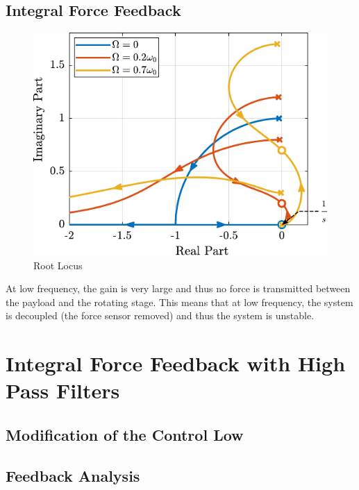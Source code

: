 \documentclass{ISMA_USD2020}
\begin{document}
\subsection{Integral Force Feedback}
\label{sec:orga5d8887}

\begin{figure}[htbp]
\centering
\includegraphics[scale=1]{figs/root_locus_pure_iff.pdf}
\caption{\label{fig:root_locus_pure_iff}Root Locus}
\end{figure}

At low frequency, the gain is very large and thus no force is transmitted between the payload and the rotating stage.
This means that at low frequency, the system is decoupled (the force sensor removed) and thus the system is unstable.

\section{Integral Force Feedback with High Pass Filters}
\label{sec:org569b7db}
\subsection{Modification of the Control Low}
\label{sec:org4d0c1ca}


\subsection{Feedback Analysis}
\label{sec:org1f34d25}
\end{document}
